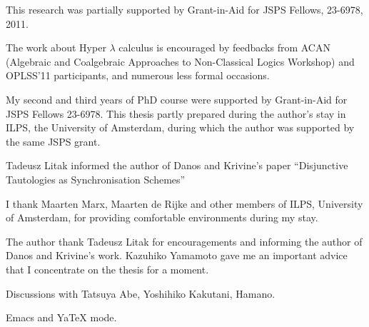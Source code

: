 \begin{acknowledge}
 This research was partially supported by
 Grant-in-Aid for JSPS Fellows, 23-6978, 2011.

 The work about Hyper $\lambda$ calculus is encouraged by feedbacks from
 ACAN (Algebraic and
 Coalgebraic
 Approaches to
 Non-Classical Logics Workshop) and OPLSS'11 participants,
 and numerous less formal occasions.

 My second and third years of PhD course were
 supported by Grant-in-Aid for JSPS Fellows 23-6978.
 This thesis partly prepared during the author's stay in
 ILPS, the University of Amsterdam, during which the author was supported
 by the same JSPS grant.

 Tadeusz Litak informed the author of Danos and Krivine's paper
 ``Disjunctive Tautologies as Synchronisation Schemes''

 I thank Maarten Marx, Maarten de Rijke and other members of ILPS,
 University of Amsterdam, for providing
 comfortable environments during my stay.

 The author thank Tadeusz Litak for encouragements and
 informing the author of Danos and Krivine's work.
 Kazuhiko Yamamoto gave me an important advice that I concentrate on the
 thesis for a moment.

 Discussions with Tatsuya Abe, Yoshihiko Kakutani,  Hamano.

 Emacs and YaTeX mode.
\end{acknowledge}
